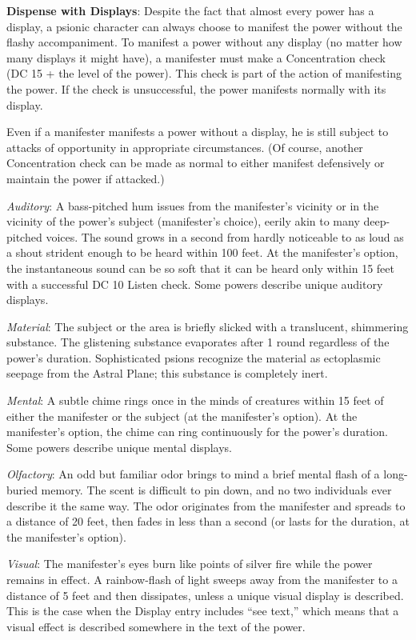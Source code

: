 \textbf{Dispense with Displays}: Despite the fact that almost every power has a display, a psionic character can always choose to manifest the power without the flashy accompaniment. To manifest a power without any display (no matter how many displays it might have), a manifester must make a Concentration check (DC 15 + the level of the power). This check is part of the action of manifesting the power. If the check is unsuccessful, the power manifests normally with its display.

Even if a manifester manifests a power without a display, he is still subject to attacks of opportunity in appropriate circumstances. (Of course, another Concentration check can be made as normal to either manifest defensively or maintain the power if attacked.)

\textit{Auditory}: A bass-pitched hum issues from the manifester's vicinity or in the vicinity of the power's subject (manifester's choice), eerily akin to many deep-pitched voices. The sound grows in a second from hardly noticeable to as loud as a shout strident enough to be heard within 100 feet. At the manifester's option, the instantaneous sound can be so soft that it can be heard only within 15 feet with a successful DC 10 Listen check. Some powers describe unique auditory displays.

\textit{Material}: The subject or the area is briefly slicked with a translucent, shimmering substance. The glistening substance evaporates after 1 round regardless of the power's duration. Sophisticated psions recognize the material as ectoplasmic seepage from the Astral Plane; this substance is completely inert.

\textit{Mental}: A subtle chime rings once in the minds of creatures within 15 feet of either the manifester or the subject (at the manifester's option). At the manifester's option, the chime can ring continuously for the power's duration. Some powers describe unique mental displays.

\textit{Olfactory}: An odd but familiar odor brings to mind a brief mental flash of a long-buried memory. The scent is difficult to pin down, and no two individuals ever describe it the same way. The odor originates from the manifester and spreads to a distance of 20 feet, then fades in less than a second (or lasts for the duration, at the manifester's option).

\textit{Visual}: The manifester's eyes burn like points of silver fire while the power remains in effect. A rainbow-flash of light sweeps away from the manifester to a distance of 5 feet and then dissipates, unless a unique visual display is described. This is the case when the Display entry includes ``see text,'' which means that a visual effect is described somewhere in the text of the power.

